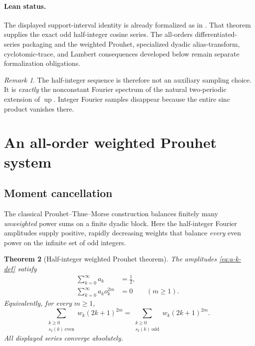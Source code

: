 \documentclass[11pt,oneside]{article}
\newtheorem{theorem}{Theorem}[section]
\theoremstyle{definition}
\theoremstyle{remark}
\newtheorem{remark}[theorem]{Remark}
\newcommand{\Up}{\operatorname{up}}
\begin{document}
\paragraph{Lean status.}
The displayed support-interval identity is already formalized as
 in
.  That theorem supplies the exact odd
half-integer cosine series.  The all-orders differentiated-series packaging
and the weighted Prouhet, specialized dyadic alias-transform, cyclotomic-trace, and Lambert
consequences developed below remain separate formalization obligations.

\begin{remark}
The half-integer sequence is therefore not an auxiliary sampling choice.  It is
\emph{exactly} the nonconstant Fourier spectrum of the natural two-periodic
extension of $\Up$.  Integer Fourier samples disappear because the entire sinc
product vanishes there.
\end{remark}

\section{An all-order weighted Prouhet system}\label{sec:prouhet}

\subsection{Moment cancellation}

The classical Prouhet--Thue--Morse construction balances finitely many
\emph{unweighted} power sums on a finite dyadic block.  Here the half-integer
Fourier amplitudes supply positive, rapidly decreasing weights that balance
\emph{every} even power on the infinite set of odd integers.

\begin{theorem}[Half-integer weighted Prouhet theorem]\label{thm:weighted-prouhet}
The amplitudes \eqref{eq:a-k-def} satisfy
\begin{align}
 \sum_{k=0}^{\infty}a_k&=\frac12,
 \label{eq:mass-half}\\
 \sum_{k=0}^{\infty}a_k o_k^{2m}&=0
 \qquad(m\ge1).
 \label{eq:all-even-moments-zero}
\end{align}
Equivalently, for every $m\ge1$,
\begin{equation}\label{eq:positive-prouhet}
 \boxed{
 \sum_{\substack{k\ge0\\s_2(k)\ \mathrm{even}}}
 w_k(2k+1)^{2m}
 =
 \sum_{\substack{k\ge0\\s_2(k)\ \mathrm{odd}}}
 w_k(2k+1)^{2m}.}
\end{equation}
All displayed series converge absolutely.
\end{theorem}
\end{document}
